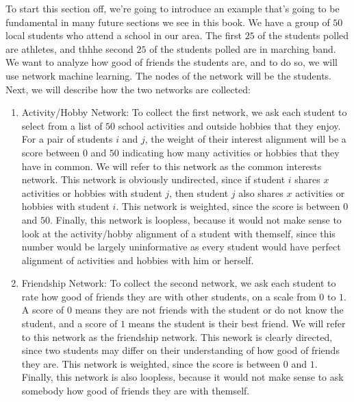 \documentclass[letterpaper,10pt,english]{jupyterBook}
\begin{document}
\sphinxAtStartPar
To start this section off, we’re going to introduce an example that’s going to be fundamental in many future sections we see in this book. We have a group of \(50\) local students who attend a school in our area. The first \(25\) of the students polled are athletes, and thhhe second \(25\) of the students polled are in marching band. We want to analyze how good of friends the students are, and to do so, we will use network machine learning. The nodes of the network will be the students. Next, we will describe how the two networks are collected:
\begin{enumerate}
%
\item {} 
\sphinxAtStartPar
Activity/Hobby Network: To collect the first network, we ask each student to select from a list of \(50\) school activities and outside hobbies that they enjoy. For a pair of students \(i\) and \(j\), the weight of their interest alignment will be a score between \(0\) and \(50\) indicating how many activities or hobbies that they have in common. We will refer to this network as the common interests network. This network is obviously undirected, since if student \(i\) shares \(x\) activities or hobbies with student \(j\), then student \(j\) also shares \(x\) activities or hobbies with student \(i\). This network is weighted, since the score is between \(0\) and \(50\). Finally, this network is loopless, because it would not make sense to look at the activity/hobby alignment of a student with themself, since this number would be largely uninformative as every student would have perfect alignment of activities and hobbies with him or herself.

\item {} 
\sphinxAtStartPar
Friendship Network: To collect the second network, we ask each student to rate how good of friends they are with other students, on a scale from \(0\) to \(1\). A score of \(0\) means they are not friends with the student or do not know the student, and a score of \(1\) means the student is their best friend. We will refer to this network as the friendship network. This nework is clearly directed, since two students may differ on their understanding of how good of friends they are. This network is weighted, since the score is between \(0\) and \(1\). Finally, this network is also loopless, because it would not make sense to ask somebody how good of friends they are with themself.

\end{enumerate}
\end{document}
